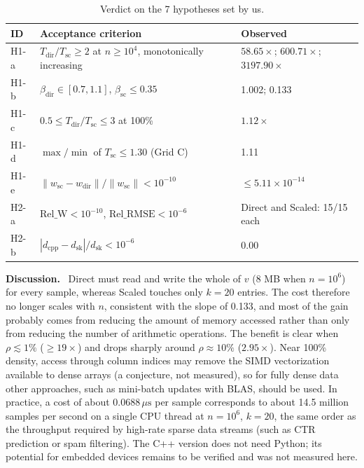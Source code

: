 \documentclass[10pt,a4paper,twocolumn]{article}
\newcommand{\x}{\times}
\newcommand{\mus}{\,\mu\mathrm{s}}
\newcommand{\relW}{\mathrm{Rel\_W}}
\newcommand{\relR}{\mathrm{Rel\_RMSE}}
\newcommand{\hd}[1]{\textbf{#1}\ }          %
\begin{document}
\begin{table}[!htb]
\centering\footnotesize
\caption{Verdict on the 7 hypotheses set by us.}\label{tab:hyp}
\begin{tabular}{@{}P{0.85cm}P{4.0cm}P{2.9cm}@{}}
\toprule
ID & Acceptance criterion & Observed\\
\midrule
H1-a & $T_{\mathrm{dir}}/T_{\mathrm{sc}}\ge2$ at $n\ge10^4$, monotonically increasing & $58.65\x$; $600.71\x$; $3197.90\x$\\
H1-b & $\beta_{\mathrm{dir}}\in[0.7,1.1]$, $\beta_{\mathrm{sc}}\le0.35$ & 1.002; 0.133\\
H1-c & $0.5\le T_{\mathrm{dir}}/T_{\mathrm{sc}}\le3$ at 100\% & $1.12\x$\\
H1-d & $\max/\min$ of $T_{\mathrm{sc}}\le1.30$ (Grid C) & 1.11\\
H1-e & $\|w_{\mathrm{sc}}-w_{\mathrm{dir}}\|/\|w_{\mathrm{sc}}\|<10^{-10}$ & $\le5.11\x10^{-14}$\\
H2-a & $\relW<10^{-10}$, $\relR<10^{-6}$ & Direct and Scaled: 15/15 each\\
H2-b & $|d_{\mathrm{cpp}}-d_{\mathrm{sk}}|/d_{\mathrm{sk}}<10^{-6}$ & 0.00\\
\bottomrule
\end{tabular}
\end{table}

\hd{Discussion.} Direct must read and write the whole of $v$ (8 MB when $n=10^6$) for every sample, whereas Scaled touches only $k=20$ entries. The cost therefore no longer scales with $n$, consistent with the slope of 0.133, and most of the gain probably comes from reducing the amount of memory accessed rather than only from reducing the number of arithmetic operations. The benefit is clear when $\rho\lesssim1\%$ ($\ge19\x$) and drops sharply around $\rho\approx10\%$ ($2.95\x$). Near 100\% density, access through column indices may remove the SIMD vectorization available to dense arrays (a conjecture, not measured), so for fully dense data other approaches, such as mini-batch updates with BLAS, should be used. In practice, a cost of about $0.0688\mus$ per sample corresponds to about 14.5 million samples per second on a single CPU thread at $n=10^6$, $k=20$, the same order as the throughput required by high-rate sparse data streams (such as CTR prediction or spam filtering). The C++ version does not need Python; its potential for embedded devices remains to be verified and was not measured here.

\end{document}
